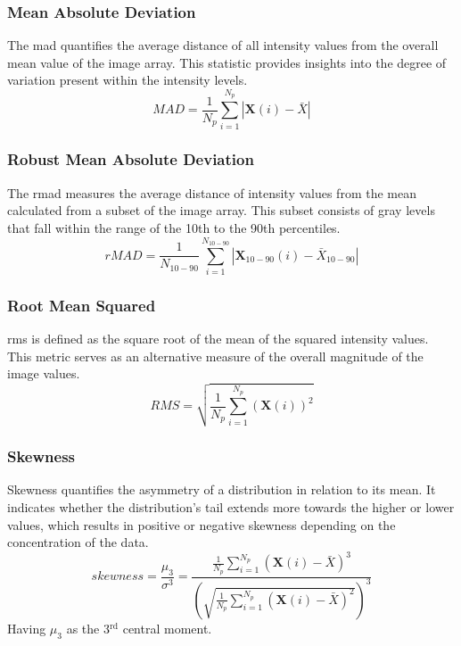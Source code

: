 \subsubsection*{Mean Absolute Deviation}
The \acf{mad} quantifies the average distance of all intensity values from the overall mean value of the image array. This statistic provides insights into the degree of variation present within the intensity levels.
\begin{equation}
    \textit{MAD} = \frac{1}{N_p}\displaystyle\sum^{N_p}_{i=1}{|\textbf{X}(i)-\bar{X}|}
\end{equation}

\subsubsection*{Robust Mean Absolute Deviation}
The \acf{rmad} measures the average distance of intensity values from the mean calculated from a subset of the image array. This subset consists of gray levels that fall within the range of the 10th to the 90th percentiles.
\begin{equation}
\textit{rMAD} = \frac{1}{N_{10-90}}\displaystyle\sum^{N_{10-90}}_{i=1}
      {|\textbf{X}_{10-90}(i)-\bar{X}_{10-90}|}
\end{equation}

\subsubsection*{Root Mean Squared}
\acf{rms} is defined as the square root of the mean of the squared intensity values. This metric serves as an alternative measure of the overall magnitude of the image values.
\begin{equation}
    \textit{RMS} = \sqrt{\frac{1}{N_p}\sum^{N_p}_{i=1}{(\textbf{X}(i))^2}}
\end{equation}

%
\subsubsection*{Skewness}
Skewness quantifies the asymmetry of a distribution in relation to its mean. It indicates whether the distribution's tail extends more towards the higher or lower values, which results in positive or negative skewness depending on the concentration of the data.
\begin{equation}
    \textit{skewness} = \displaystyle\frac{\mu_3}{\sigma^3} =
        \frac{\frac{1}{N_p}\sum^{N_p}_{i=1}{(\textbf{X}(i)-\bar{X})^3}}
        {\left(\sqrt{\frac{1}{N_p}\sum^{N_p}_{i=1}{(\textbf{X}(i)-\bar{X})^2}}\right)^3}
\end{equation}
Having $\mu_3$ as the 3$^{\text{rd}}$ central moment.

